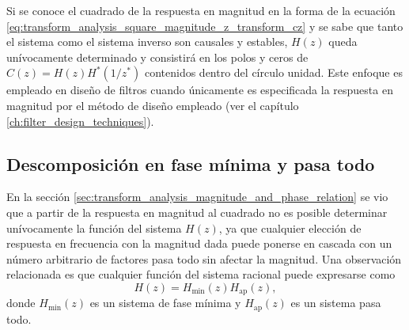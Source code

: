 \documentclass[a4paper]{report}
\begin{document}
Si se conoce el cuadrado de la respuesta en magnitud en la forma de la ecuación \ref{eq:transform_analysis_square_magnitude_z_transform_cz} y se sabe que tanto el sistema como el sistema inverso son causales y estables, \(H(z)\) queda unívocamente determinado y consistirá en los polos y ceros de \(C(z)=H(z)H^*(1/z^*)\) contenidos dentro del círculo unidad. Este enfoque es empleado en diseño de filtros cuando únicamente es especificada la respuesta en magnitud por el método de diseño empleado (ver el capítulo \ref{ch:filter_design_techniques}).

\subsection{Descomposición en fase mínima y pasa todo}\label{sec:transform_analysis_min_phase_all_pass_decomposition}

En la sección \ref{sec:transform_analysis_magnitude_and_phase_relation} se vio que a partir de la respuesta en magnitud al cuadrado no es posible determinar unívocamente la función del sistema \(H(z)\), ya que cualquier elección de respuesta en frecuencia con la magnitud dada puede ponerse en cascada con un número arbitrario de factores pasa todo sin afectar la magnitud. Una observación relacionada es que cualquier función del sistema racional puede expresarse como
\begin{equation}\label{eq:transform_analysis_min_phase_all_pass_decomposition}
 H(z)=H_\textrm{min}(z)H_\textrm{ap}(z), 
\end{equation}
donde \(H_\textrm{min}(z)\) es un sistema de fase mínima y \(H_\textrm{ap}(z)\) es un sistema pasa todo.
\end{document}
